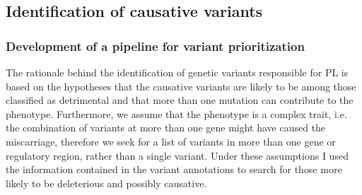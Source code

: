 \documentclass[
tikz,
11pt, %
oneside, %
english, %
singlespacing, %
headsepline, %
]{MastersDoctoralThesisV2} %
\begin{document}

\subsection{Identification of causative variants }
\subsubsection{Development of a pipeline for variant prioritization}

The rationale behind the identification of genetic variants responsible for PL is based on the hypotheses that the causative variants are likely to be among those classified as detrimental and that more than one mutation can contribute to the phenotype. Furthermore, we assume that the phenotype is a complex trait, i.e. the combination of variants at more than one gene might have caused the miscarriage, therefore we seek for a list of variants in more than one gene or regulatory region, rather than a single variant. Under these assumptions I used the information contained in the variant annotations to search for those more likely to be deleterious and possibly causative.\\
\end{document}
